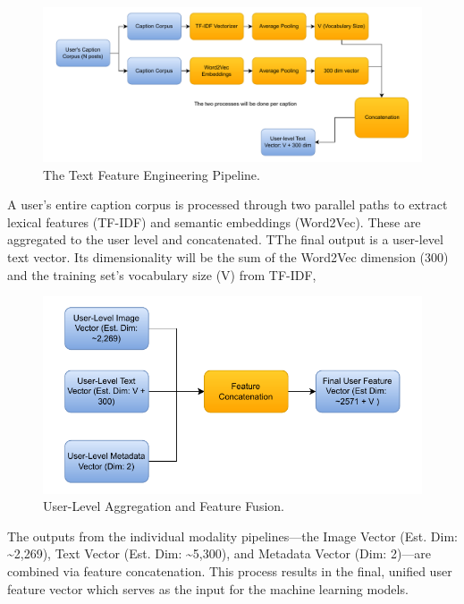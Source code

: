 \begin{figure}[H]
	\centering
	\includegraphics[width=\textwidth]{"figures/Text-Pipeline-Diagram.pdf"}
	\caption{The Text Feature Engineering Pipeline. }
	\label{fig:text_pipeline_diagram}
\end{figure}

A user's entire caption corpus is processed through two parallel paths to extract lexical features (TF-IDF) and semantic embeddings (Word2Vec). These are aggregated to the user level and concatenated. TThe final output is a user-level text vector. Its dimensionality will be the sum of the Word2Vec dimension (300) and the training set's vocabulary size (V) from TF-IDF, 


\begin{figure}[H]
	\centering
	\includegraphics[width=\textwidth]{"figures/Fusion-Diagram.pdf"}
	\caption{User-Level Aggregation and Feature Fusion.}
	\label{fig:fusion_diagram}
\end{figure}

The outputs from the individual modality pipelines—the Image Vector (Est. Dim: \textasciitilde2,269), Text Vector (Est. Dim: \textasciitilde5,300), and Metadata Vector (Dim: 2)—are combined via feature concatenation. This process results in the final, unified user feature vector which serves as the input for the machine learning models.

